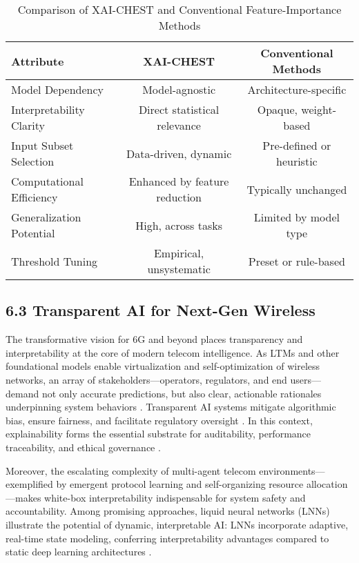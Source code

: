 \documentclass[11pt]{article}
\begin{document}
\begin{table}[tb]
    \centering
    \caption{Comparison of XAI-CHEST and Conventional Feature-Importance Methods}
    \label{tab:xai_chest_summary}
    \begin{tabular}{|l|c|c|}
        \hline
        \textbf{Attribute} & \textbf{XAI-CHEST} & \textbf{Conventional Methods} \\
        \hline
        Model Dependency & Model-agnostic & Architecture-specific \\
        \hline
        Interpretability Clarity & Direct statistical relevance & Opaque, weight-based \\
        \hline
        Input Subset Selection & Data-driven, dynamic & Pre-defined or heuristic \\
        \hline
        Computational Efficiency & Enhanced by feature reduction & Typically unchanged \\
        \hline
        Generalization Potential & High, across tasks & Limited by model type \\
        \hline
        Threshold Tuning & Empirical, unsystematic & Preset or rule-based \\
        \hline
    \end{tabular}
\end{table}

\subsection{6.3 Transparent AI for Next-Gen Wireless}

The transformative vision for 6G and beyond places transparency and interpretability at the core of modern telecom intelligence. As LTMs and other foundational models enable virtualization and self-optimization of wireless networks, an array of stakeholders—operators, regulators, and end users—demand not only accurate predictions, but also clear, actionable rationales underpinning system behaviors \cite{ref41}. Transparent AI systems mitigate algorithmic bias, ensure fairness, and facilitate regulatory oversight \cite{ref7}. In this context, explainability forms the essential substrate for auditability, performance traceability, and ethical governance \cite{ref7}\cite{ref8}\cite{ref9}\cite{ref26}\cite{ref33}\cite{ref35}\cite{ref38}\cite{ref41}.

Moreover, the escalating complexity of multi-agent telecom environments—exemplified by emergent protocol learning and self-organizing resource allocation—makes white-box interpretability indispensable for system safety and accountability. Among promising approaches, liquid neural networks (LNNs) illustrate the potential of dynamic, interpretable AI: LNNs incorporate adaptive, real-time state modeling, conferring interpretability advantages compared to static deep learning architectures \cite{ref35}.
\end{document}
